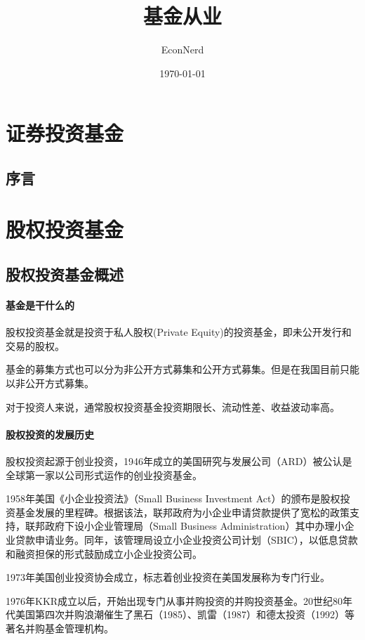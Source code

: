 \documentclass[UTF8,12pt]{ctexbook}
\title{基金从业} %
\author{EconNerd}
\date{\today}
\numberwithin{equation}{section} %
\numberwithin{figure}{section}
\numberwithin{table}{section}
\begin{document}
	\maketitle
	\tableofcontents
	\newpage
	\chapter{证券投资基金}
	\section{序言}
	
	\chapter{股权投资基金}
	\section{股权投资基金概述}
	
	\subsubsection{基金是干什么的}
	
	
	股权投资基金就是投资于私人股权(Private Equity)的投资基金，即未公开发行和交易的股权。
	
	基金的募集方式也可以分为非公开方式募集和公开方式募集。但是在我国目前只能以非公开方式募集。
	
	对于投资人来说，通常股权投资基金投资期限长、流动性差、收益波动率高。
	
	
	\subsubsection{股权投资的发展历史}
	
	股权投资起源于创业投资，1946年成立的美国研究与发展公司（ARD）被公认是全球第一家以公司形式运作的创业投资基金。
	
	1958年美国《小企业投资法》（Small Business Investment Act）的颁布是股权投资基金发展的里程碑。根据该法，联邦政府为小企业申请贷款提供了宽松的政策支持，联邦政府下设小企业管理局（Small Business Administration）其中办理小企业贷款申请业务。同年，该管理局设立小企业投资公司计划（SBIC），以低息贷款和融资担保的形式鼓励成立小企业投资公司。
	
	1973年美国创业投资协会成立，标志着创业投资在美国发展称为专门行业。
	
	1976年KKR成立以后，开始出现专门从事并购投资的并购投资基金。20世纪80年代美国第四次并购浪潮催生了黑石（1985）、凯雷（1987）和德太投资（1992）等著名并购基金管理机构。
	
\end{document}
